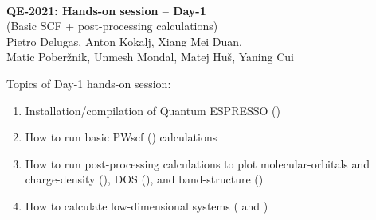 \documentclass[landscape]{foils}
\begin{document}

\blue
~\\
\vspace*{4cm}
\MyLogo{~}
\vspace{5em}
\begin{center}
  {\burgundy\LARGE\bf QE-2021: Hands-on session -- Day-1}\\[2em]
  {\burgundy\LARGE (Basic SCF + post-processing calculations)}
  ~\\[1.5em]  
  \large Pietro Delugas, Anton Kokalj, Xiang Mei Duan,\\
  Matic Pober\v{z}nik, Unmesh Mondal, Matej Hu\v{s}, Yaning Cui
\end{center}

Topics of Day-1 hands-on session:
\begin{enumerate}
\item Installation/compilation of Quantum ESPRESSO ()
\item How to run basic PWscf () calculations
\item How to run post-processing calculations to plot
  molecular-orbitals and charge-density (), DOS
  (), and band-structure ()
\item How to calculate low-dimensional systems ( and
  )
\end{enumerate}
    
\end{document}

